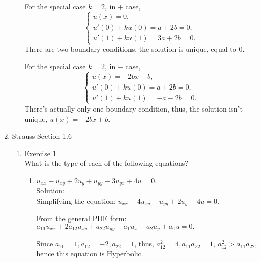 \documentclass[12pt]{article}%
\begin{document}
\begin{enumerate}
\begin{enumerate}
For the special case $k=2$, in $+$ case, 
\begin{equation*}
    \begin{cases}
        u(x)=0,
        \\
        u'\left(0\right) + ku\left(0\right) = a+2b = 0,
        \\
        u'\left(1\right) + ku\left(1\right) = 3a+2b = 0.
    \end{cases}
\end{equation*}
There are two boundary conditions, the solution is unique, equal to 0.

For the special case $k=2$, in $-$ case,
\begin{equation*}
    \begin{cases}
        u(x)=-2bx+b,
        \\
        u'\left(0\right) + ku\left(0\right) = a+2b = 0,
        \\
        u'\left(1\right) + ku\left(1\right) = -a-2b = 0.
    \end{cases}
\end{equation*}
There's actually only one boundary condition, thus, the solution isn't unique, $u(x)=-2bx+b$.
    \end{enumerate}

    \pagebreak
    
    \item Strauss Section 1.6 \smallskip
    \begin{enumerate}
        \item Exercise 1 \smallskip \\
        What is the type of each of the following equations?
        \begin{enumerate}
            \item $u_{xx} - u_{xy} + 2u_y+u_{yy}-3u_{yx} + 4u = 0$. \smallskip \\
        Solution:\\
        Simplifying the equation: $u_{xx} - 4u_{xy} +u_{yy}+ 2u_y + 4u = 0.$
        
        From the general PDE form: $a_{11}u_{xx}+2a_{12}u_{xy}+a_{22}u_{yy}+a_{1}u_{x}+a_{2}u_{y}+a_{0}u=0.$
        
        Since $a_{11}=1,a_{12}=-2,a_{22}=1$, thus, $a_{12}^2=4, a_{11}a_{22}=1$, $a_{12}^2>a_{11}a_{22}$, hence this equation is Hyperbolic.
            

\end{enumerate}
\end{enumerate}
\end{enumerate}
\end{document}
